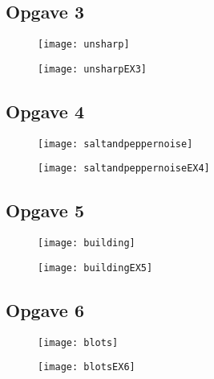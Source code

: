 \documentclass{article}
\begin{document}
	\subsection*{Opgave 3}
	
	\begin{figure}[!htb]
		\begin{minipage}{0.48\textwidth}
			\centering
			\texttt{[image: unsharp]}
			\caption*{}
			\label{Fig:ex2_1}
		\end{minipage}\hfill
		\begin{minipage}{0.48\textwidth}
			\centering
			\texttt{[image: unsharpEX3]}
			\caption*{}
			\label{Fig:ex2_2}
		\end{minipage}
	\end{figure}
\newpage
	\subsection*{Opgave 4}
	\begin{figure}[!htb]
		\begin{minipage}{0.48\textwidth}
			\centering
			\texttt{[image: saltandpeppernoise]}
			\caption*{}
			\label{Fig:ex2_1}
		\end{minipage}\hfill
		\begin{minipage}{0.48\textwidth}
			\centering
			\texttt{[image: saltandpeppernoiseEX4]}
			\caption*{}
			\label{Fig:ex2_2}
		\end{minipage}
	\end{figure}
	\subsection*{Opgave 5}
	\begin{figure}[!htb]
		\begin{minipage}{0.48\textwidth}
			\centering
			\texttt{[image: building]}
			\caption*{}
			\label{Fig:ex2_1}
		\end{minipage}\hfill
		\begin{minipage}{0.48\textwidth}
			\centering
			\texttt{[image: buildingEX5]}
			\caption*{}
			\label{Fig:ex2_2}
		\end{minipage}
	\end{figure}
\newpage
	\subsection*{Opgave 6}
	\begin{figure}[!htb]
		\begin{minipage}{0.48\textwidth}
			\centering
			\texttt{[image: blots]}
			\caption*{}
			\label{Fig:ex2_1}
		\end{minipage}\hfill
		\begin{minipage}{0.48\textwidth}
			\centering
			\texttt{[image: blotsEX6]}
			\caption*{}
			\label{Fig:ex2_2}
		\end{minipage}
	\end{figure}
	
\end{document}
